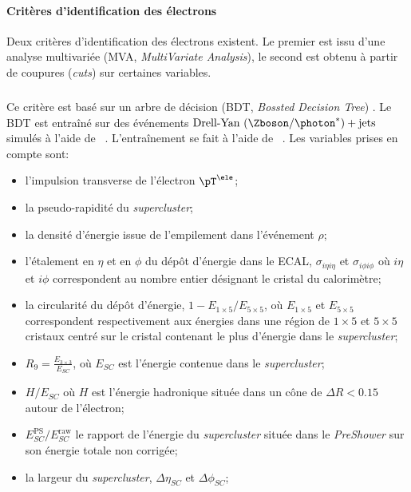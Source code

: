 \paragraph{Critères d'identification des électrons}
Deux critères d'identification des électrons existent.
Le premier est issu d'une analyse multivariée (MVA, \emph{MultiVariate Analysis}), le second est obtenu à partir de coupures (\emph{cuts}) sur certaines variables.
\subparagraph{\EleIDMVA}
Ce critère est basé sur un arbre de décision (BDT, \emph{Bossted Decision Tree}) \cite{cmsElectronMVA}.
Le BDT est entraîné sur des événements $\text{Drell-Yan ($\Zboson/\photon^*$)} + \text{jets}$ simulés à l'aide de \MADGRAPH~\cite{madgraph5}.
L'entraînement se fait à l'aide de \XGBOOST~\cite{xgboost}.
Les variables prises en compte sont:
\begin{itemize}
\item l'impulsion transverse de l'électron $\pT^{\ele}$;
\item la pseudo-rapidité du \emph{supercluster};
\item la densité d'énergie issue de l'empilement dans l'événement $\rho$;

\item l'étalement en $\eta$ et en $\phi$ du dépôt d'énergie dans le ECAL, $\sigma_{i\eta i\eta}$ et $\sigma_{i\phi i\phi}$ où $i\eta$ et $i\phi$ correspondent au nombre entier désignant le cristal du calorimètre;
\item la circularité du dépôt d'énergie, $1- E_{1\times5}/E_{5\times5}$, où $ E_{1\times5}$ et $E_{5\times5}$ correspondent respectivement aux énergies dans une région de $1\times5$ et $5\times5$ cristaux centré sur le cristal contenant le plus d'énergie dans le \emph{supercluster};
\item $R_9 = \frac{E_{3\times3}}{E_{SC}}$, où $E_{SC}$ est l'énergie contenue dans le \emph{supercluster};
\item $H/E_{SC}$ où $H$ est l'énergie hadronique située dans un cône de $\Delta R < \num{0.15}$ autour de l'électron;
\item $E_{SC}^\text{PS}/E_{SC}^\text{raw}$ le rapport de l'énergie du \emph{supercluster} située dans le \emph{PreShower} sur son énergie totale non corrigée;
\item la largeur du \emph{supercluster}, $\Delta \eta_{SC}$ et $\Delta \phi_{SC}$;


\end{itemize}
